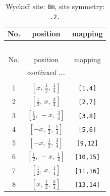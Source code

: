 \documentclass[fleqn,8pt]{jsarticle}
\begin{document}
\begin{longtable}{ccc}
\caption{Wyckoff site: {\tt 8m}, site symmetry: {\tt .2.}}
 \\
 \hline \hline
No. & position & mapping \\ \hline \endfirsthead

\multicolumn{2}{l}{\tablename\ \thetable{}} \\
 \hline \hline
No. & position & mapping \\ \hline \endhead

 \hline \hline
\multicolumn{2}{r}{\footnotesize\it continued ...} \\ \endfoot

 \hline \hline
\multicolumn{2}{r}{} \\ \endlastfoot

1 & $\left[ x,\, \frac{1}{2},\, \frac{1}{4} \right]$ & {\tt [1,4]} \\ \hline
2 & $\left[ \frac{1}{2},\, x,\, \frac{3}{4} \right]$ & {\tt [2,7]} \\ \hline
3 & $\left[ \frac{1}{2},\, - x,\, \frac{3}{4} \right]$ & {\tt [3,8]} \\ \hline
4 & $\left[ - x,\, \frac{1}{2},\, \frac{1}{4} \right]$ & {\tt [5,6]} \\ \hline
5 & $\left[ - x,\, \frac{1}{2},\, \frac{3}{4} \right]$ & {\tt [9,12]} \\ \hline
6 & $\left[ \frac{1}{2},\, - x,\, \frac{1}{4} \right]$ & {\tt [10,15]} \\ \hline
7 & $\left[ \frac{1}{2},\, x,\, \frac{1}{4} \right]$ & {\tt [11,16]} \\ \hline
8 & $\left[ x,\, \frac{1}{2},\, \frac{3}{4} \right]$ & {\tt [13,14]} \\
\end{longtable}
\renewcommand{\arraystretch}{1.2}
\end{document}
